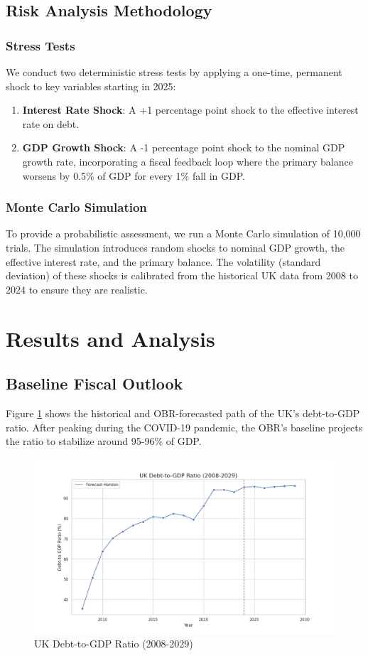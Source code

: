 \documentclass[12pt, a4paper]{article}
\begin{document}
\subsection{Risk Analysis Methodology}
\subsubsection{Stress Tests}
We conduct two deterministic stress tests by applying a one-time, permanent shock to key variables starting in 2025:
\begin{enumerate}
    \item \textbf{Interest Rate Shock}: A +1 percentage point shock to the effective interest rate on debt.
    \item \textbf{GDP Growth Shock}: A -1 percentage point shock to the nominal GDP growth rate, incorporating a fiscal feedback loop where the primary balance worsens by 0.5\% of GDP for every 1\% fall in GDP.
\end{enumerate}

\subsubsection{Monte Carlo Simulation}
To provide a probabilistic assessment, we run a Monte Carlo simulation of 10,000 trials. The simulation introduces random shocks to nominal GDP growth, the effective interest rate, and the primary balance. The volatility (standard deviation) of these shocks is calibrated from the historical UK data from 2008 to 2024 to ensure they are realistic.

\section{Results and Analysis}
\subsection{Baseline Fiscal Outlook}
Figure \ref{fig:debt_gdp} shows the historical and OBR-forecasted path of the UK's debt-to-GDP ratio. After peaking during the COVID-19 pandemic, the OBR's baseline projects the ratio to stabilize around 95-96\% of GDP.

\begin{figure}[h!]
    \centering
    \includegraphics[width=\textwidth]{plots/debt_to_gdp_ratio.png}
    \caption{UK Debt-to-GDP Ratio (2008-2029)}
    \label{fig:debt_gdp}
\end{figure}
\end{document}
